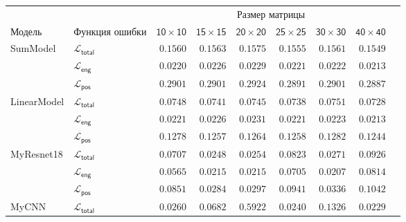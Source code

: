 \documentclass[a4paper,12pt]{extarticle}
\begin{document}
\begin{table}[ht]
	\footnotesize
	\centering
	\begin{tabular}{llrrrrrrr}
		\toprule
		{} & {} & \multicolumn{6}{c}{\textsf{Размер матрицы}} \\
		\cmidrule(lr){3-8}
		\textsf{Модель} & \textsf{Функция ошибки} & $\mathsf{10 \times 10}$ &  $\mathsf{15 \times 15}$ &  $\mathsf{20 \times 20}$ &  $\mathsf{25 \times 25}$ &  $\mathsf{30 \times 30}$ &  $\mathsf{40 \times 40}$ \\
		\midrule
        \textsf{SumModel} & $\mathcal{L}_{\mathsf{total}}$ & $\mathsf{0.1560}$ & $\mathsf{0.1563}$ & $\mathsf{0.1575}$ & $\mathsf{0.1555}$ & $\mathsf{0.1561}$ & $\mathsf{0.1549}$ \\
        {} & $\mathcal{L}_{\mathsf{eng}}$ & $\mathsf{0.0220}$ & $\mathsf{0.0226}$ & $\mathsf{0.0229}$ & $\mathsf{0.0221}$ & $\mathsf{0.0222}$ & $\mathsf{0.0213}$ \\
        {} & $\mathcal{L}_{\mathsf{pos}}$ & $\mathsf{0.2901}$ & $\mathsf{0.2901}$ & $\mathsf{0.2924}$ & $\mathsf{0.2891}$ & $\mathsf{0.2901}$ & $\mathsf{0.2887}$ \\
        \midrule
        \textsf{LinearModel} & $\mathcal{L}_{\mathsf{total}}$ & $\mathsf{0.0748}$ & $\mathsf{0.0741}$ & $\mathsf{0.0745}$ & $\mathsf{0.0738}$ & $\mathsf{0.0751}$ & $\mathsf{0.0728}$ \\
        {} & $\mathcal{L}_{\mathsf{eng}}$ & $\mathsf{0.0221}$ & $\mathsf{0.0226}$ & $\mathsf{0.0231}$ & $\mathsf{0.0221}$ & $\mathsf{0.0223}$ & $\mathsf{0.0213}$ \\
        {} & $\mathcal{L}_{\mathsf{pos}}$ & $\mathsf{0.1278}$ & $\mathsf{0.1257}$ & $\mathsf{0.1264}$ & $\mathsf{0.1258}$ & $\mathsf{0.1282}$ & $\mathsf{0.1244}$ \\
        \midrule
        \textsf{MyResnet18} & $\mathcal{L}_{\mathsf{total}}$ & $\mathsf{0.0707}$ & $\mathsf{0.0248}$ & $\mathsf{0.0254}$ & $\mathsf{0.0823}$ & $\mathsf{0.0271}$ & $\mathsf{0.0926}$ \\
        {} & $\mathcal{L}_{\mathsf{eng}}$ & $\mathsf{0.0565}$ & $\mathsf{0.0215}$ & $\mathsf{0.0215}$ & $\mathsf{0.0705}$ & $\mathsf{0.0207}$ & $\mathsf{0.0814}$ \\
        {} & $\mathcal{L}_{\mathsf{pos}}$ & $\mathsf{0.0851}$ & $\mathsf{0.0284}$ & $\mathsf{0.0297}$ & $\mathsf{0.0941}$ & $\mathsf{0.0336}$ & $\mathsf{0.1042}$ \\
        \midrule
        \textsf{MyCNN} & $\mathcal{L}_{\mathsf{total}}$ & $\mathsf{0.0260}$ & $\mathsf{0.0682}$ & $\mathsf{0.5922}$ & $\mathsf{0.0240}$ & $\mathsf{0.1326}$ & $\mathsf{0.0229}$ \\

\end{tabular}
\end{table}
\end{document}

